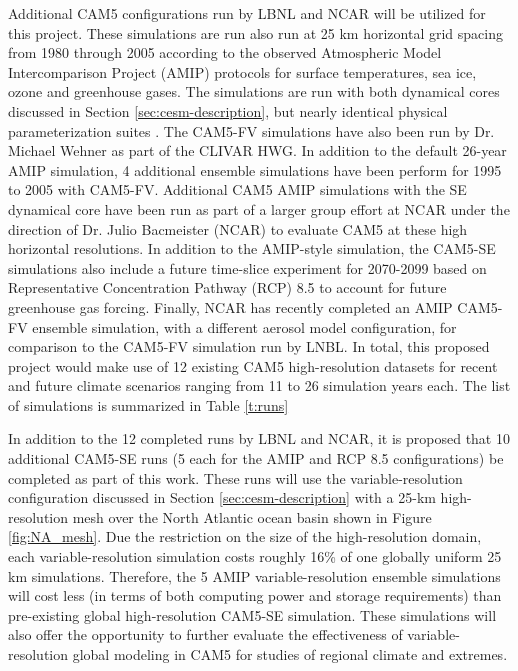 \documentclass[11pt]{article}
\begin{document}
Additional CAM5 configurations run by LBNL and NCAR will be utilized for this project. These simulations are run also run at 25 km horizontal grid spacing from 1980 through 2005 according to the observed Atmospheric Model Intercomparison Project (AMIP) protocols \citep{Gates1992,Gates1999} for surface temperatures, sea ice, ozone and greenhouse gases. The simulations are run with both dynamical cores discussed in Section \ref{sec:cesm-description}, but nearly identical physical parameterization suites \citep{RBNetal2010NCAR}. The CAM5-FV simulations have also been run by Dr. Michael Wehner as part of the CLIVAR HWG. In addition to the default 26-year AMIP simulation, 4 additional ensemble simulations have been perform for 1995 to 2005 with CAM5-FV. Additional CAM5 AMIP simulations with the SE dynamical core have been run as part of a larger group effort at NCAR under the direction of Dr. Julio Bacmeister (NCAR) to evaluate CAM5 at these high horizontal resolutions. In addition to the AMIP-style simulation, the CAM5-SE simulations also include a future time-slice experiment for 2070-2099 based on Representative Concentration Pathway (RCP) 8.5 to account for future greenhouse gas forcing. Finally, NCAR has recently completed an AMIP CAM5-FV ensemble simulation, with a different aerosol model configuration, for comparison to the CAM5-FV simulation run by LNBL.  In total, this proposed project would make use of 12 existing CAM5 high-resolution datasets for recent and future climate scenarios ranging from 11 to 26 simulation years each.  The list of simulations is summarized in Table \ref{t:runs}

In addition to the 12 completed runs by LBNL and NCAR, it is proposed that 10 additional CAM5-SE runs (5 each for the AMIP and RCP 8.5 configurations) be completed as part of this work.  These runs will use the variable-resolution configuration discussed in Section \ref{sec:cesm-description} with a 25-km high-resolution mesh over the North Atlantic ocean basin shown in Figure \ref{fig:NA_mesh}. Due the restriction on the size of the high-resolution domain, each variable-resolution simulation costs roughly 16\% of one globally uniform 25 km simulations.  Therefore, the 5 AMIP variable-resolution ensemble simulations will cost less (in terms of both computing power and storage requirements) than pre-existing global high-resolution CAM5-SE simulation. These simulations will also offer the opportunity to further evaluate the effectiveness of variable-resolution global modeling in CAM5 for studies of regional climate and extremes. 
\end{document}
